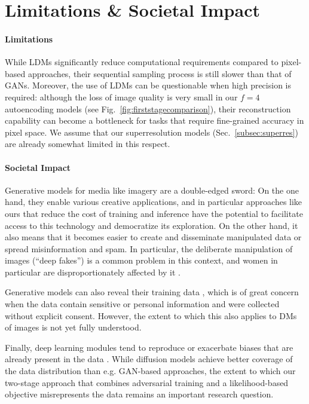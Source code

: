 \section{Limitations \& Societal Impact}
\label{sec:limitations}
\enlargethispage{\baselineskip}

\paragraph{Limitations}
While LDMs significantly reduce computational requirements compared to pixel-based approaches, their sequential sampling process is still slower than that of GANs. Moreover, the use of LDMs can be questionable when high precision is required: although the loss of image quality is very small in our $f=4$ autoencoding models (see Fig.~\ref{fig:firststagecomparison}), 
their reconstruction capability can become a bottleneck for tasks that require fine-grained accuracy in pixel space. We assume that our superresolution models (Sec.~\ref{subsec:superres}) are already somewhat limited in this respect.

\paragraph{Societal Impact} Generative models for media like imagery are a double-edged sword: On the one hand, they enable various creative applications, and in particular approaches like ours that reduce the cost of training and inference have the potential to facilitate access to this technology and democratize its exploration. On the other hand, it also means that it becomes easier to create and disseminate manipulated data or spread misinformation and spam. In particular, the deliberate manipulation of images (``deep fakes'') is a common problem in this context, and women in particular are disproportionately affected by it \cite{denton2021workshop, franks2018sex}.

Generative models can also reveal their training data \cite{carlini2021extracting, tinsley2021face}, which is of great concern when the data contain sensitive or personal information and were collected without explicit consent. However, the extent to which this also applies to DMs of images is not yet fully understood.

Finally, deep learning modules tend to reproduce or exacerbate biases that are already present in the data \cite{torralba2011unbiased, jain2020imperfect, esser2020note}. While diffusion models achieve better coverage of the data distribution than e.g. GAN-based approaches, the extent to which our two-stage approach that combines adversarial training and a likelihood-based objective misrepresents the data remains an important research question.

